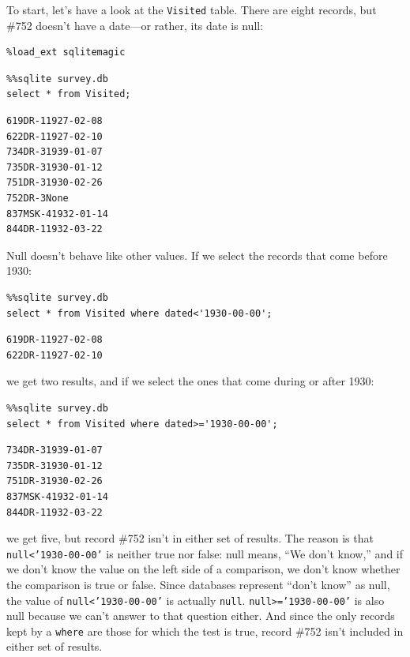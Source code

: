 \documentclass{book}
\begin{document}
To start, let's have a look at the \texttt{Visited} table. There are
eight records, but \#752 doesn't have a date---or rather, its date is
null:

\begin{verbatim}
%load_ext sqlitemagic
\end{verbatim}

\begin{verbatim}
%%sqlite survey.db
select * from Visited;
\end{verbatim}

\begin{verbatim}
619DR-11927-02-08
622DR-11927-02-10
734DR-31939-01-07
735DR-31930-01-12
751DR-31930-02-26
752DR-3None
837MSK-41932-01-14
844DR-11932-03-22
\end{verbatim}

Null doesn't behave like other values. If we select the records that
come before 1930:

\begin{verbatim}
%%sqlite survey.db
select * from Visited where dated<'1930-00-00';
\end{verbatim}

\begin{verbatim}
619DR-11927-02-08
622DR-11927-02-10
\end{verbatim}

we get two results, and if we select the ones that come during or after
1930:

\begin{verbatim}
%%sqlite survey.db
select * from Visited where dated>='1930-00-00';
\end{verbatim}

\begin{verbatim}
734DR-31939-01-07
735DR-31930-01-12
751DR-31930-02-26
837MSK-41932-01-14
844DR-11932-03-22
\end{verbatim}

we get five, but record \#752 isn't in either set of results. The reason
is that \texttt{null\textless{}'1930-00-00'} is neither true nor false:
null means, ``We don't know,'' and if we don't know the value on the
left side of a comparison, we don't know whether the comparison is true
or false. Since databases represent ``don't know'' as null, the value of
\texttt{null\textless{}'1930-00-00'} is actually \texttt{null}.
\texttt{null\textgreater{}='1930-00-00'} is also null because we can't
answer to that question either. And since the only records kept by a
\texttt{where} are those for which the test is true, record \#752 isn't
included in either set of results.
\end{document}
